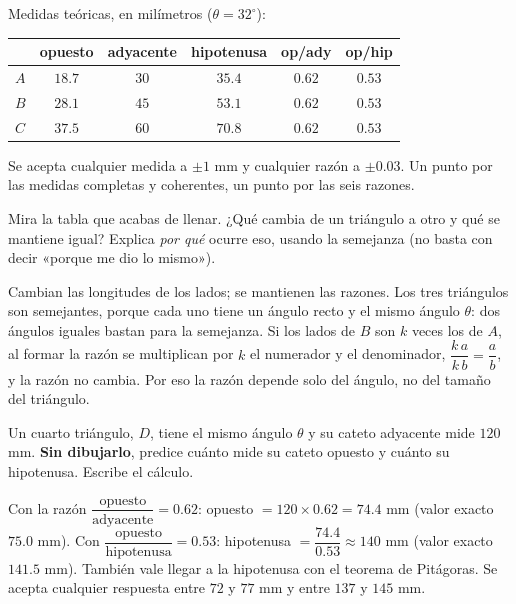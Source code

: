 \documentclass[11pt]{article}
\begin{document}
\begin{preguntas}
\begin{solucion}[0.5cm]
Medidas teóricas, en milímetros ($\theta = 32^\circ$):

\begin{center}
{\renewcommand{\arraystretch}{1.3}
\begin{tabular}{@{}l c c c c c@{}}
  \toprule
  & opuesto & adyacente & hipotenusa & op/ady & op/hip\\
  \midrule
  $A$ & $\num{18,7}$ & $30$ & $\num{35,4}$ & $\num{0,62}$ & $\num{0,53}$\\
  $B$ & $\num{28,1}$ & $45$ & $\num{53,1}$ & $\num{0,62}$ & $\num{0,53}$\\
  $C$ & $\num{37,5}$ & $60$ & $\num{70,8}$ & $\num{0,62}$ & $\num{0,53}$\\
  \bottomrule
\end{tabular}}
\end{center}

Se acepta cualquier medida a $\pm 1$ mm y cualquier razón a $\pm \num{0,03}$. Un punto por
las medidas completas y coherentes, un punto por las seis razones.
\end{solucion}

\pregunta[1] Mira la tabla que acabas de llenar. ¿Qué cambia de un triángulo a otro y qué
se mantiene igual? Explica \emph{por qué} ocurre eso, usando la semejanza (no basta con
decir «porque me dio lo mismo»).
\begin{solucion}[4cm]
Cambian las longitudes de los lados; se mantienen las razones. Los tres triángulos son
semejantes, porque cada uno tiene un ángulo recto y el mismo ángulo $\theta$: dos ángulos
iguales bastan para la semejanza. Si los lados de $B$ son $k$ veces los de $A$, al formar
la razón se multiplican por $k$ el numerador y el denominador,
$\dfrac{k\,a}{k\,b} = \dfrac{a}{b}$, y la razón no cambia. Por eso la razón depende solo
del ángulo, no del tamaño del triángulo.
\end{solucion}

\pregunta[1] Un cuarto triángulo, $D$, tiene el mismo ángulo $\theta$ y su cateto
adyacente mide $120$ mm. \textbf{Sin dibujarlo}, predice cuánto mide su cateto opuesto y
cuánto su hipotenusa. Escribe el cálculo.
\begin{solucion}[3.5cm]
Con la razón $\dfrac{\text{opuesto}}{\text{adyacente}} = \num{0,62}$:
opuesto $= 120 \times \num{0,62} = \num{74,4}$ mm (valor exacto $\num{75,0}$ mm).
Con $\dfrac{\text{opuesto}}{\text{hipotenusa}} = \num{0,53}$:
hipotenusa $= \dfrac{\num{74,4}}{\num{0,53}} \approx 140$ mm (valor exacto
$\num{141,5}$ mm). También vale llegar a la hipotenusa con el teorema de Pitágoras.
Se acepta cualquier respuesta entre $72$ y $77$ mm y entre $137$ y $145$ mm.
\end{solucion}


\end{preguntas}
\end{document}
